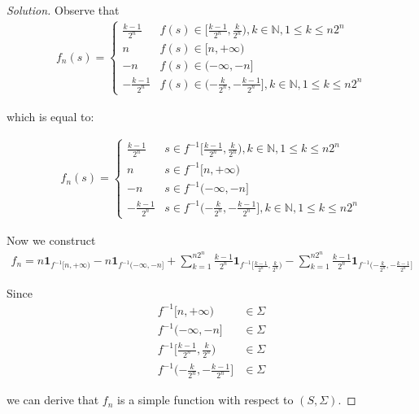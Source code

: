 \documentclass[a4paper, linespread=1.5]{article}
\begin{document}
    \begin{proof}[Solution]
    	Observe that
    	\begin{align*}
    		f_n(s)=\begin{cases}
    		\frac{k-1}{2^n}& f(s)\in [\frac{k-1}{2^n},\frac{k}{2^n}), k\in \mathbb{N}, 1\le k \le n2^n \\
    		n& f(s)\in [n,+\infty) \\
    		-n& f(s)\in (-\infty,-n] \\
    		-\frac{k-1}{2^n}& f(s)\in (-\frac{k}{2^n},-\frac{k-1}{2^n}], k\in \mathbb{N}, 1\le k \le n2^n
    		\end{cases}
    	\end{align*}
    	
    	which is equal to:
    	
    	\begin{align*}
   			f_n(s)=\begin{cases}
    		\frac{k-1}{2^n}& s\in f^{-1}[\frac{k-1}{2^n},\frac{k}{2^n}), k\in \mathbb{N}, 1\le k \le n2^n \\
    		n& s\in f^{-1}[n,+\infty) \\
    		-n&  s\in f^{-1}(-\infty,-n] \\
    		-\frac{k-1}{2^n}& s\in f^{-1} (-\frac{k}{2^n},-\frac{k-1}{2^n}], k\in \mathbb{N}, 1\le k \le n2^n
    		\end{cases}
    	\end{align*}
    	
    	Now we construct 
    	\begin{align*}
    		f_n=n\mathbf{1}_{f^{-1}[n,+\infty)}
    		-n\mathbf{1}_{f^{-1}(-\infty,-n]}
    		+\sum\limits_{k=1}^{n2^n}\frac{k-1}{2^n}\mathbf{1}_{f^{-1}[\frac{k-1}{2^n},\frac{k}{2^n})}
    		-\sum\limits_{k=1}^{n2^n}\frac{k-1}{2^n}\mathbf{1}_{f^{-1} (-\frac{k}{2^n},-\frac{k-1}{2^n}]}
    	\end{align*}
    	
    	Since 
    	\begin{align*}
    		f^{-1}[n,+\infty)&\in \Sigma \\
    		f^{-1}(-\infty,-n] &\in \Sigma \\
    		f^{-1}[\frac{k-1}{2^n},\frac{k}{2^n}) &\in \Sigma\\
    		f^{-1} (-\frac{k}{2^n},-\frac{k-1}{2^n}] &\in \Sigma
    	\end{align*}
    	
    	we can derive that $f_n$ is a simple function with respect to $(S,\Sigma)$.
    	

\end{proof}
\end{document}

